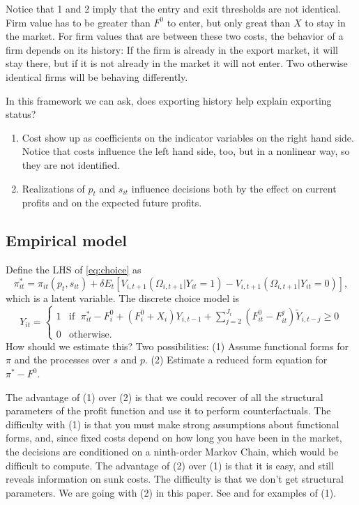 \documentclass[11pt, pdftex]{article}
\begin{document}
Notice that 1 and 2 imply that the entry and exit thresholds are not identical.  Firm value has to be greater than $F^0$ to enter, but only great than $X$ to stay in the market.  For firm values that are between these two costs, the behavior of a firm depends on its history: If the firm is already in the export market, it will stay there, but if it is not already in the market it will not enter. Two otherwise identical firms will be behaving differently.

In this framework we can ask, does exporting history help explain exporting status?
\begin{enumerate}
\item  Cost show up as coefficients on the indicator variables on the right hand side.
Notice that costs influence the left hand side, too, but in a nonlinear way, so they are not identified.
  \item Realizations of $p_t$  and $s_{it}$  influence decisions both by the effect on current profits and on the expected future profits.
\end{enumerate}

\subsection{Empirical model}
Define the LHS of \eqref{eq:choice} as
\begin{equation}
    \pi^*_{it} = \pi_{it}\left(p_t, s_{it} \right) + \delta E_t  \left[ V_{i,t+1}\left(\Omega_{i,t+1} \vert Y_{it}=1 \right) - V_{i,t+1}\left(\Omega_{i,t+1} \vert Y_{it}=0 \right) \right],
\end{equation}
which is a latent variable. The discrete choice model is
\begin{equation}
    Y_{it} = \begin{cases}
      1  &\mbox{if  }\; \pi^*_{it} - F_i^0 +\left(F_i^0+X_i \right)Y_{i,t-1}+\sum_{j=2}^{J_i}\left(F_{it}^0-F_{it}^j   \right)\widetilde{Y}_{i,t-j} \geq 0 \\
      0 &\mbox{otherwise}.
    \end{cases}
\end{equation}
How should we estimate this?  Two possibilities: (1)  Assume functional forms for $\pi$  and the processes over $s$ and $p$. (2)  Estimate a reduced form equation for $\pi^*-F^0$.

The advantage of (1) over (2) is that we could recover of all the structural parameters of the profit function and use it to perform counterfactuals. The difficulty with (1) is that you  must make strong assumptions about functional forms, and, since fixed costs depend on how long you have been in the market, the decisions are conditioned on a ninth-order Markov Chain, which would be difficult to compute. The advantage of (2) over (1) is that it is easy, and still reveals information on sunk costs. The difficulty is that we don't get structural parameters. We are going with (2) in this paper.  See \citet{dasRobertsTybout} and \citet{ruhlWillis} for examples of (1).
\end{document}
